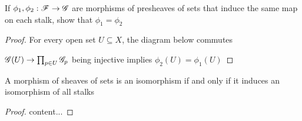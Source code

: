 \begin{proposition}
	If $\phi_1, \phi_2: \mathscr{F} \to \mathscr{G}$ are morphisms of presheaves of sets that induce the same map on each stalk, show that $\phi_1 = \phi_2$
\end{proposition}

\begin{proof}
	For every open set $U \subseteq X$, the diagram below commutes
	
	\begin{center}
	\end{center}
	
	$\mathscr{G}(U) \to \prod_{p \in U}\mathscr{G}_p$ being injective implies $\phi_2(U) = \phi_1(U)$
\end{proof}

\begin{proposition}
	A morphism of sheaves of sets is an isomorphism if and only if it induces an isomorphism of all stalks
\end{proposition}

\begin{proof}
	content...
\end{proof}